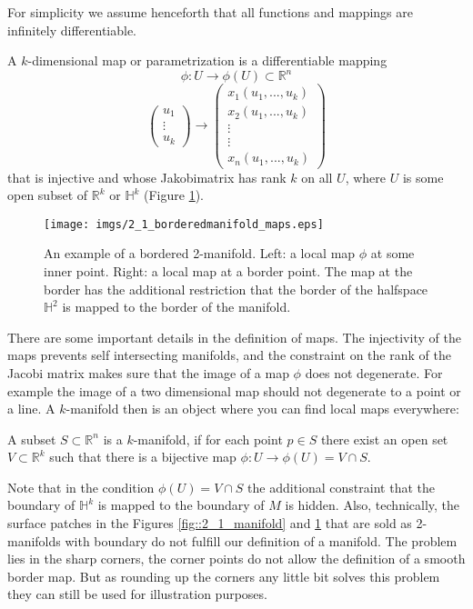 For simplicity we assume henceforth that all functions and mappings are infinitely differentiable.
\[\]		
		
\begin{definition}[Map] A $k$-dimensional map or parametrization is a differentiable mapping 
\[\phi: U \rightarrow \phi(U)\subset \mathbb R^n\] 
\[\begin{pmatrix}
	u_1\\ \vdots \\ u_k
\end{pmatrix} \rightarrow \begin{pmatrix}x_1(u_1,...,u_k)\\x_2(u_1,...,u_k)\\ \vdots \\ \vdots \\ x_n(u_1,...,u_k)\end{pmatrix}\]
that is injective and whose Jakobimatrix has rank $k$ on all $U$, where $U$ is some open subset of $\mathbb R^k$ or $\mathbb H^k$ (Figure \ref{fig::2_1_mapping}). 		
\end{definition} 

\begin{figure}
	\begin{center}
		\texttt{[image: imgs/2\_1\_borderedmanifold\_maps.eps]}
		\caption{An example of a bordered 2-manifold. Left: a local map $\phi$ at some inner point. Right: a local map at a border point. The map at the border has the additional restriction that the border of the halfspace $\mathbb H^2$ is mapped to the border of the manifold.}
		\label{fig::2_1_mapping}
	\end{center}
\end{figure}

There are some important details in the definition of maps. The injectivity of the maps prevents self intersecting manifolds, and the constraint on the rank of the Jacobi matrix makes sure that the image of a map $\phi$ does not degenerate. For example the image of a two dimensional map should not degenerate to a point or a line. A $k$-manifold then is an object where you can find local maps everywhere:

\begin{definition}[Manifold] A subset $S\subset \mathbb R^n$ is a $k$-manifold, if for each point $p \in S$ there exist an open set $V\subset \mathbb R^k$ such that there is a bijective map $\phi: U \rightarrow  \phi(U) = V\cap S$.
\end{definition} 
Note that in the condition $\phi(U) = V \cap S$ the additional constraint that the boundary of $\mathbb H^k$ is mapped to the boundary of $M$ is hidden. Also, technically, the surface patches in the Figures \ref{fig::2_1_manifold} and \ref{fig::2_1_mapping} that are sold as 2-manifolds with boundary do not fulfill our definition of a manifold. The problem lies in the sharp corners, the corner points do not allow the definition of a smooth border map. But as rounding up the corners any little bit solves this problem they can still be used for illustration purposes.


